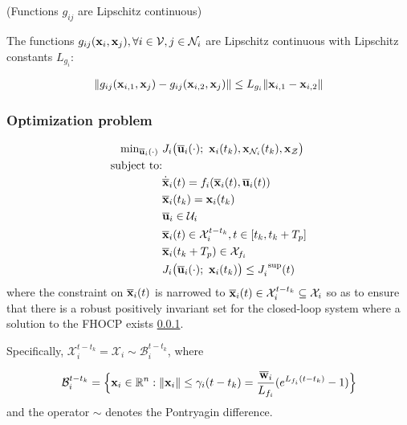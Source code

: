 \begin{gg_box}
\begin{assumption} (Functions $g_{ij}$ are Lipschitz continuous)

  The functions $g_{ij}(\bm{\mathbf{x}}_i, \bm{\mathbf{x}}_j), \forall i \in \mathcal{V}, j \in \mathcal{N}_i$ are
  Lipschitz continuous with Lipschitz constants $L_{g_i}$:

  \begin{align}
    \| g_{ij}(\bm{\mathbf{x}}_{i,1}, \bm{\mathbf{x}}_j) - g_{ij}(\bm{\mathbf{x}}_{i,2}, \bm{\mathbf{x}}_j)\| \leq L_{g_i} \|\bm{\mathbf{x}}_{i,1} - \bm{\mathbf{x}}_{i,2} \|
  \end{align}

  \label{ass:g_ij_Lipschitz}
\end{assumption}
\end{gg_box}

\subsubsection{Optimization problem}

\begin{align}
  \text{min}_{\overline{\bm{\mathbf{u}}}_i (\cdot)}\ &
    J_i \big(\overline{\bm{\mathbf{u}}}_i (\cdot);\ \bm{\mathbf{x}}_i(t_k), \bm{\mathbf{x}}_{\mathcal{N}_i}(t_k), \bm{\mathbf{x}}_{\mathcal{Z}}\big) \\
  \text{subject to:} & \\
  & \dot{\overline{\bm{\mathbf{x}}}}_i(t) = f_i (\overline{\bm{\mathbf{x}}}_i (t), \overline{\bm{\mathbf{u}}}_i (t)) \\
  & \overline{\bm{\mathbf{x}}}_i (t_k) = \bm{\mathbf{x}}_i (t_k) \\
  & \overline{\bm{\mathbf{u}}}_i \in \mathcal{U}_i \\
  & \overline{\bm{\mathbf{x}}}_i (t) \in \mathcal{X}_i^{t - t_k}, t \in [t_k, t_k + T_p] \\
  & \overline{\bm{\mathbf{x}}}_i (t_k + T_p) \in \mathcal{X}_{f_i} \\
  & J_i \big(\overline{\bm{\mathbf{u}}}_i (\cdot);\ \bm{\mathbf{x}}_i(t_k)\big) \leq J_i^{\text{ sup}}(t)
\end{align}
where the constraint on $\overline{\bm{\mathbf{x}}}_i (t)$ is narrowed to
$\overline{\bm{\mathbf{x}}}_i (t) \in \mathcal{X}_i^{t - t_k} \subseteq \mathcal{X}_i$
so as to ensure that there is a robust positively invariant set for the
closed-loop system where a solution to the FHOCP exists \ref{}.


Specifically,
$\mathcal{X}_i^{t - t_k} = \mathcal{X}_i \sim \mathcal{B}_i^{t-t_k}$, where

\begin{align}
  \mathcal{B}_i^{t-t_k} =
  \Big\{\bm{\mathbf{x}}_i \in \mathbb{R}^n : \|\bm{\mathbf{x}}_i\| \leq \gamma_i (t-t_k) = \frac{\overline{\bm{\mathbf{w}}}_i}{L_{f_i}} (e^{L_{f_i} (t-t_k)} - 1) \Big\}
\end{align}
and the operator $\sim$ denotes the Pontryagin difference.

